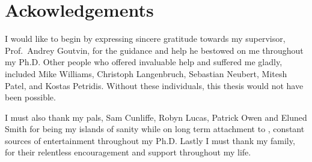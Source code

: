 \clearpage
\chapter*{\centering Ackowledgements}
\begin{center}
  \begin{minipage}{0.8\textwidth}
    I would like to begin by expressing sincere gratitude towards my supervisor, Prof.~Andrey Goutvin,
    for the guidance and help he bestowed on me throughout my Ph.D.
    Other people who offered invaluable help and suffered me gladly, included
    Mike Williams,
    Christoph Langenbruch,
    Sebastian Neubert,
    Mitesh Patel, and
    Kostas Petridis.
    Without these individuals, this thesis would not have been possible.

    I must also thank my pals, Sam Cunliffe, Robyn Lucas, Patrick Owen and Eluned Smith for being
    my islands of sanity while on long
    term attachment to \cern, constant sources of entertainment throughout my Ph.D.
    Lastly I must thank my family, for their relentless encouragement and support throughout my
    life.

  \end{minipage}
\end{center}



